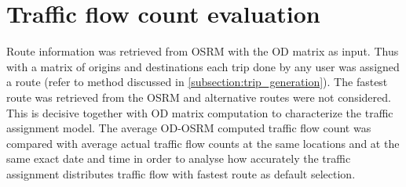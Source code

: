 \documentclass[12pt, a4paper]{report}
\theoremstyle{definition}
\theoremstyle{definition}%
\theoremstyle{definition}%
\theoremstyle{definition}%
\theoremstyle{definition}%
\theoremstyle{definition}%
\begin{document}
\section{Traffic flow count evaluation} \label{section:traffic_flow_evaluation}

Route information was retrieved from OSRM with the OD matrix as input. Thus with a matrix of origins and destinations each trip done by any user was assigned a route (refer to method discussed in \ref{subsection:trip_generation}). The fastest route was retrieved from the OSRM and alternative routes were not considered. This is decisive together with OD matrix computation to characterize the traffic assignment model. The average OD-OSRM computed traffic flow count was compared with average actual traffic flow counts at the same locations and at the same exact date and time in order to analyse how accurately the traffic assignment distributes traffic flow with fastest route as default selection.
\end{document}

